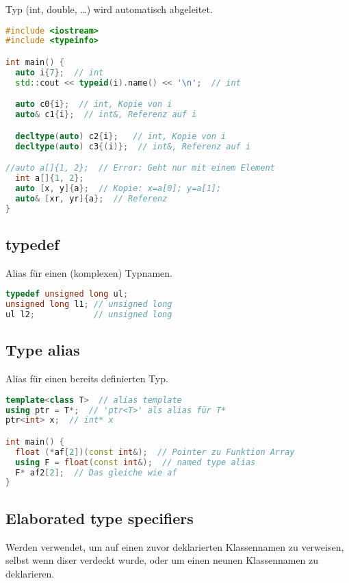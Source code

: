 \documentclass[10pt,twocolumn]{scrartcl}
\begin{document}
Typ (int, double, \dots) wird automatisch abgeleitet.

\begin{lstlisting}[language=C++]
#include <iostream>
#include <typeinfo>

int main() {
  auto i{7};  // int
  std::cout << typeid(i).name() << '\n';  // int

  auto c0{i};  // int, Kopie von i
  auto& c1{i};  // int&, Referenz auf i

  decltype(auto) c2{i};   // int, Kopie von i
  decltype(auto) c3{(i)};  // int&, Referenz auf i

//auto a[]{1, 2};  // Error: Geht nur mit einem Element
  int a[]{1, 2};
  auto [x, y]{a};  // Kopie: x=a[0]; y=a[1];
  auto& [xr, yr]{a};  // Referenz
}
\end{lstlisting}

\subsection{typedef}

Alias für einen (komplexen) Typnamen.

\begin{lstlisting}[language=C++]
typedef unsigned long ul;
unsigned long l1; // unsigned long
ul l2;            // unsigned long
\end{lstlisting}

\subsection{Type alias}

Alias für einen bereits definierten Typ.

\begin{lstlisting}[language=C++]
template<class T>  // alias template
using ptr = T*;  // 'ptr<T>' als alias für T*
ptr<int> x;  // int* x

int main() {
  float (*af[2])(const int&);  // Pointer zu Funktion Array
  using F = float(const int&);  // named type alias
  F* af2[2];  // Das gleiche wie af
}
\end{lstlisting}

\subsection{Elaborated type specifiers}

Werden verwendet, um auf einen zuvor deklarierten Klassennamen zu verweisen,
selbst wenn diser verdeckt wurde, oder um einen neunen Klassennamen zu
deklarieren.
\end{document}

